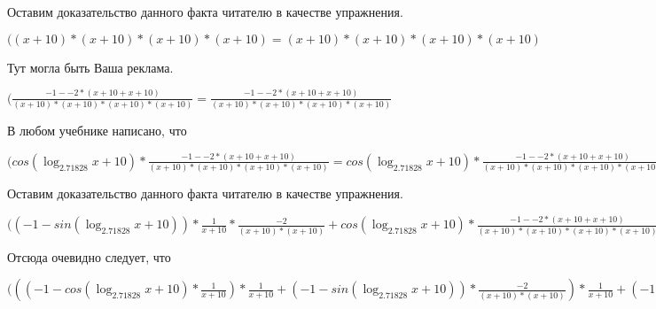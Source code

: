 \documentclass[12pt,a4paper,fleqn]{article}
\theoremstyle{definition}
\begin{document}
Оставим доказательство данного факта читателю в качестве упражнения.

$(( x  +  10 ) * ( x  +  10 ) * ( x  +  10 ) * ( x  +  10 ) = ( x  +  10 ) * ( x  +  10 ) * ( x  +  10 ) * ( x  +  10 )$

Тут могла быть Ваша реклама.

$(\frac{ -1  -  -2  * ( x  +  10  +  x  +  10 )}{( x  +  10 ) * ( x  +  10 ) * ( x  +  10 ) * ( x  +  10 )}
 = \frac{ -1  -  -2  * ( x  +  10  +  x  +  10 )}{( x  +  10 ) * ( x  +  10 ) * ( x  +  10 ) * ( x  +  10 )}
$

В любом учебнике написано, что

$(cos(\log_{ 2.71828 }{ x  +  10 }) * \frac{ -1  -  -2  * ( x  +  10  +  x  +  10 )}{( x  +  10 ) * ( x  +  10 ) * ( x  +  10 ) * ( x  +  10 )}
 = cos(\log_{ 2.71828 }{ x  +  10 }) * \frac{ -1  -  -2  * ( x  +  10  +  x  +  10 )}{( x  +  10 ) * ( x  +  10 ) * ( x  +  10 ) * ( x  +  10 )}
$

Оставим доказательство данного факта читателю в качестве упражнения.

$(( -1  - sin(\log_{ 2.71828 }{ x  +  10 })) * \frac{ 1 }{ x  +  10 }
 * \frac{ -2 }{( x  +  10 ) * ( x  +  10 )}
 + cos(\log_{ 2.71828 }{ x  +  10 }) * \frac{ -1  -  -2  * ( x  +  10  +  x  +  10 )}{( x  +  10 ) * ( x  +  10 ) * ( x  +  10 ) * ( x  +  10 )}
 = ( -1  - sin(\log_{ 2.71828 }{ x  +  10 })) * \frac{ 1 }{ x  +  10 }
 * \frac{ -2 }{( x  +  10 ) * ( x  +  10 )}
 + cos(\log_{ 2.71828 }{ x  +  10 }) * \frac{ -1  -  -2  * ( x  +  10  +  x  +  10 )}{( x  +  10 ) * ( x  +  10 ) * ( x  +  10 ) * ( x  +  10 )}
$

Отсюда очевидно следует, что

$((( -1  - cos(\log_{ 2.71828 }{ x  +  10 }) * \frac{ 1 }{ x  +  10 }
) * \frac{ 1 }{ x  +  10 }
 + ( -1  - sin(\log_{ 2.71828 }{ x  +  10 })) * \frac{ -2 }{( x  +  10 ) * ( x  +  10 )}
) * \frac{ 1 }{ x  +  10 }
 + ( -1  - sin(\log_{ 2.71828 }{ x  +  10 })) * \frac{ 1 }{ x  +  10 }
 * \frac{ -2 }{( x  +  10 ) * ( x  +  10 )}
 + ( -1  - sin(\log_{ 2.71828 }{ x  +  10 })) * \frac{ 1 }{ x  +  10 }
 * \frac{ -2 }{( x  +  10 ) * ( x  +  10 )}
 + cos(\log_{ 2.71828 }{ x  +  10 }) * \frac{ -1  -  -2  * ( x  +  10  +  x  +  10 )}{( x  +  10 ) * ( x  +  10 ) * ( x  +  10 ) * ( x  +  10 )}
 = (( -1  - cos(\log_{ 2.71828 }{ x  +  10 }) * \frac{ 1 }{ x  +  10 }
) * \frac{ 1 }{ x  +  10 }
 + ( -1  - sin(\log_{ 2.71828 }{ x  +  10 })) * \frac{ -2 }{( x  +  10 ) * ( x  +  10 )}
) * \frac{ 1 }{ x  +  10 }
 + ( -1  - sin(\log_{ 2.71828 }{ x  +  10 })) * \frac{ 1 }{ x  +  10 }
 * \frac{ -2 }{( x  +  10 ) * ( x  +  10 )}
 + ( -1  - sin(\log_{ 2.71828 }{ x  +  10 })) * \frac{ 1 }{ x  +  10 }
 * \frac{ -2 }{( x  +  10 ) * ( x  +  10 )}
 + cos(\log_{ 2.71828 }{ x  +  10 }) * \frac{ -1  -  -2  * ( x  +  10  +  x  +  10 )}{( x  +  10 ) * ( x  +  10 ) * ( x  +  10 ) * ( x  +  10 )}
$
\end{document}
